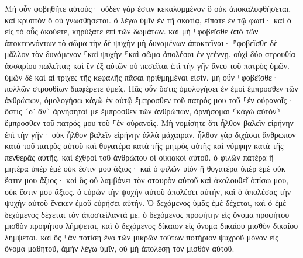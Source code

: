 \documentclass[twoside, 9pt]{extreport}
\begin{document}
Μὴ οὖν φοβηθῆτε αὐτούς· οὐδὲν γάρ ἐστιν κεκαλυμμένον ὃ οὐκ ἀποκαλυφθήσεται, καὶ κρυπτὸν ὃ οὐ γνωσθήσεται. 
ὃ λέγω ὑμῖν ἐν τῇ σκοτίᾳ, εἴπατε ἐν τῷ φωτί· καὶ ὃ εἰς τὸ οὖς ἀκούετε, κηρύξατε ἐπὶ τῶν δωμάτων. 
καὶ μὴ ⸀φοβεῖσθε ἀπὸ τῶν ἀποκτεννόντων τὸ σῶμα τὴν δὲ ψυχὴν μὴ δυναμένων ἀποκτεῖναι· ⸁φοβεῖσθε δὲ μᾶλλον τὸν δυνάμενον ⸀καὶ ψυχὴν ⸁καὶ σῶμα ἀπολέσαι ἐν γεέννῃ. 
οὐχὶ δύο στρουθία ἀσσαρίου πωλεῖται; καὶ ἓν ἐξ αὐτῶν οὐ πεσεῖται ἐπὶ τὴν γῆν ἄνευ τοῦ πατρὸς ὑμῶν. 
ὑμῶν δὲ καὶ αἱ τρίχες τῆς κεφαλῆς πᾶσαι ἠριθμημέναι εἰσίν. 
μὴ οὖν ⸀φοβεῖσθε· πολλῶν στρουθίων διαφέρετε ὑμεῖς. 
Πᾶς οὖν ὅστις ὁμολογήσει ἐν ἐμοὶ ἔμπροσθεν τῶν ἀνθρώπων, ὁμολογήσω κἀγὼ ἐν αὐτῷ ἔμπροσθεν τοῦ πατρός μου τοῦ ⸀ἐν οὐρανοῖς· 
ὅστις ⸂δ᾽ ἂν⸃ ἀρνήσηταί με ἔμπροσθεν τῶν ἀνθρώπων, ἀρνήσομαι ⸂κἀγὼ αὐτὸν⸃ ἔμπροσθεν τοῦ πατρός μου τοῦ ⸀ἐν οὐρανοῖς. 
Μὴ νομίσητε ὅτι ἦλθον βαλεῖν εἰρήνην ἐπὶ τὴν γῆν· οὐκ ἦλθον βαλεῖν εἰρήνην ἀλλὰ μάχαιραν. 
ἦλθον γὰρ διχάσαι ἄνθρωπον κατὰ τοῦ πατρὸς αὐτοῦ καὶ θυγατέρα κατὰ τῆς μητρὸς αὐτῆς καὶ νύμφην κατὰ τῆς πενθερᾶς αὐτῆς, 
καὶ ἐχθροὶ τοῦ ἀνθρώπου οἱ οἰκιακοὶ αὐτοῦ. 
ὁ φιλῶν πατέρα ἢ μητέρα ὑπὲρ ἐμὲ οὐκ ἔστιν μου ἄξιος· καὶ ὁ φιλῶν υἱὸν ἢ θυγατέρα ὑπὲρ ἐμὲ οὐκ ἔστιν μου ἄξιος· 
καὶ ὃς οὐ λαμβάνει τὸν σταυρὸν αὐτοῦ καὶ ἀκολουθεῖ ὀπίσω μου, οὐκ ἔστιν μου ἄξιος. 
ὁ εὑρὼν τὴν ψυχὴν αὐτοῦ ἀπολέσει αὐτήν, καὶ ὁ ἀπολέσας τὴν ψυχὴν αὐτοῦ ἕνεκεν ἐμοῦ εὑρήσει αὐτήν. 
Ὁ δεχόμενος ὑμᾶς ἐμὲ δέχεται, καὶ ὁ ἐμὲ δεχόμενος δέχεται τὸν ἀποστείλαντά με. 
ὁ δεχόμενος προφήτην εἰς ὄνομα προφήτου μισθὸν προφήτου λήμψεται, καὶ ὁ δεχόμενος δίκαιον εἰς ὄνομα δικαίου μισθὸν δικαίου λήμψεται. 
καὶ ὃς ⸀ἂν ποτίσῃ ἕνα τῶν μικρῶν τούτων ποτήριον ψυχροῦ μόνον εἰς ὄνομα μαθητοῦ, ἀμὴν λέγω ὑμῖν, οὐ μὴ ἀπολέσῃ τὸν μισθὸν αὐτοῦ. 
\end{document}
